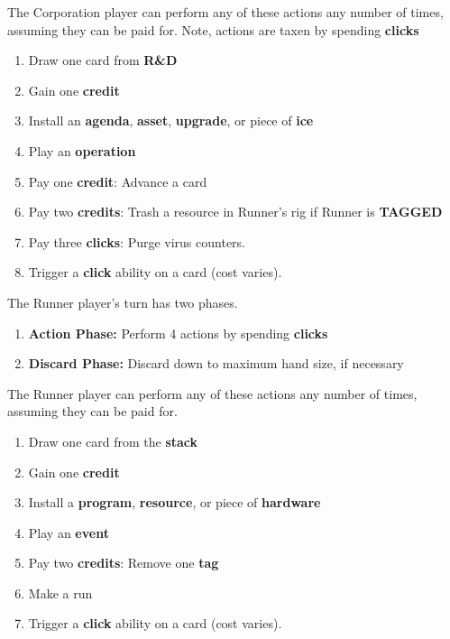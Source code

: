 \documentclass[12pt]{article}
\newenvironment{enumerateCustom}
{\begin{enumerate}
  \setlength{\itemsep}{1pt}
  \setlength{\parskip}{0pt}
  \setlength{\parsep}{0pt}}
{\end{enumerate}}
\begin{document}
\begin{multicols*}{2}
The Corporation player can perform any of these actions any number of times, assuming they can be paid for. Note, actions are taxen by spending \textbf{clicks}
\begin{enumerateCustom}
	\item Draw one card from \textbf{R\&D}
	\item Gain one \textbf{credit}
	\item Install an \textbf{agenda}, \textbf{asset}, \textbf{upgrade}, or piece of \textbf{ice}
	\item Play an \textbf{operation}
	\item Pay one \textbf{credit}: Advance a card
	\item Pay two \textbf{credits}: Trash a resource in Runner's rig if Runner is \textbf{TAGGED}
	\item Pay three \textbf{clicks}: Purge virus counters.
	\item Trigger a \textbf{click} ability on a card (cost varies).
\end{enumerateCustom}

The Runner player's turn has two phases.
\begin{enumerateCustom}
	\item \textbf{Action Phase:} Perform 4 actions by spending \textbf{clicks}
	\item \textbf{Discard Phase:} Discard down to maximum hand size, if necessary
\end{enumerateCustom}

The Runner player can perform any of these actions any number of times, assuming they can be paid for.
\begin{enumerateCustom}
	\item Draw one card from the \textbf{stack}
	\item Gain one \textbf{credit}
	\item Install a \textbf{program}, \textbf{resource}, or piece of \textbf{hardware}
	\item Play an \textbf{event}
	\item Pay two \textbf{credits}: Remove one \textbf{tag}
	\item Make a run
	\item Trigger a \textbf{click} ability on a card (cost varies).
\end{enumerateCustom}


\end{multicols*}
\end{document}
